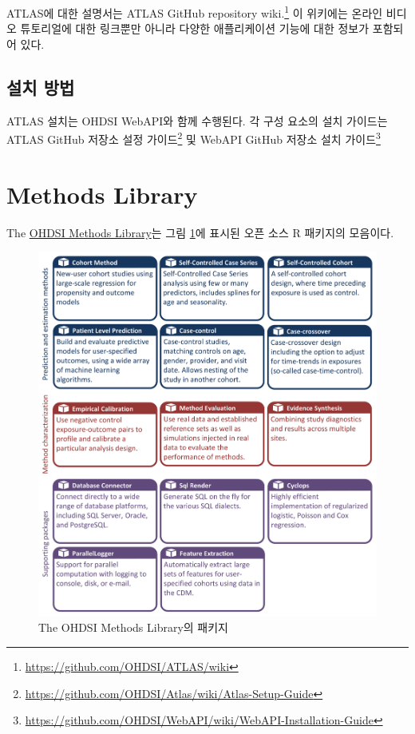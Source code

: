 \documentclass[11pt]{book}
\let\rmarkdownfootnote\footnote%
\def\footnote{\protect\rmarkdownfootnote}
\theoremstyle{definition}
\theoremstyle{definition}
\theoremstyle{definition}
\theoremstyle{remark}
\begin{document}
ATLAS에 대한 설명서는 ATLAS GitHub repository wiki.\footnote{\url{https://github.com/OHDSI/ATLAS/wiki}}
이 위키에는 온라인 비디오 튜토리얼에 대한 링크뿐만 아니라 다양한
애플리케이션 기능에 대한 정보가 포함되어 있다.

\subsection{설치 방법}\label{-}

ATLAS 설치는 OHDSI WebAPI와 함께 수행된다. 각 구성 요소의 설치 가이드는
ATLAS GitHub 저장소 설정 가이드\footnote{\url{https://github.com/OHDSI/Atlas/wiki/Atlas-Setup-Guide}}
및 WebAPI GitHub 저장소 설치 가이드\footnote{\url{https://github.com/OHDSI/WebAPI/wiki/WebAPI-Installation-Guide}}

\section{Methods Library}\label{methods-library}

The \href{https://ohdsi.github.io/MethodsLibrary/}{OHDSI Methods
Library}는 그림 \ref{fig:methodsLibrary}에 표시된 오픈 소스 R 패키지의
모음이다. 

\begin{figure}

{\centering \includegraphics[width=1\linewidth]{images/OhdsiAnalyticsTools/methodsLibrary} 

}

\caption{The OHDSI Methods Library의 패키지}\label{fig:methodsLibrary}
\end{figure}
\end{document}

